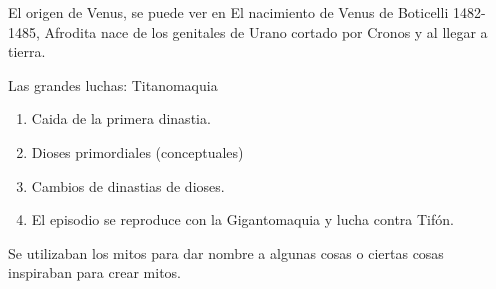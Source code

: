 \documentclass[12pt, twoside, openright]{report} %
\begin{document}
El origen de Venus, se puede ver en El nacimiento de Venus de Boticelli 1482-1485, Afrodita nace de los genitales de Urano cortado por Cronos y al llegar a tierra.

Las grandes luchas: Titanomaquia
\begin{enumerate}
  \item Caida de la primera dinastia.
  \item Dioses primordiales (conceptuales)
  \item Cambios de dinastias de dioses.
  \item El episodio se reproduce con la Gigantomaquia y lucha contra Tifón.
\end{enumerate}

Se utilizaban los mitos para dar nombre a algunas cosas o ciertas cosas inspiraban para crear mitos.
\end{document}
